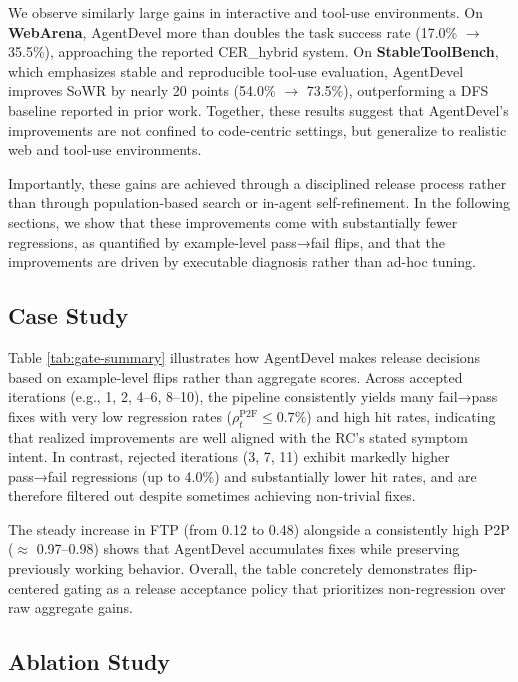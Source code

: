 \documentclass[11pt]{article}
\begin{document}
We observe similarly large gains in interactive and tool-use environments. On \textbf{WebArena}, AgentDevel more than doubles the task success rate (17.0\% $\rightarrow$ 35.5\%), approaching the reported CER\_hybrid system. On \textbf{StableToolBench}, which emphasizes stable and reproducible tool-use evaluation, AgentDevel improves SoWR by nearly 20 points (54.0\% $\rightarrow$ 73.5\%), outperforming a DFS baseline reported in prior work. Together, these results suggest that AgentDevel’s improvements are not confined to code-centric settings, but generalize to realistic web and tool-use environments.

Importantly, these gains are achieved through a disciplined release process rather than through population-based search or in-agent self-refinement. In the following sections, we show that these improvements come with substantially fewer regressions, as quantified by example-level pass→fail flips, and that the improvements are driven by executable diagnosis rather than ad-hoc tuning.

\subsection{Case Study}



Table \ref{tab:gate-summary} illustrates how AgentDevel makes release decisions based on example-level flips rather than aggregate scores. Across accepted iterations (e.g., 1, 2, 4–6, 8–10), the pipeline consistently yields many fail→pass fixes with very low regression rates ($\rho^{\mathrm{P2F}}_t \le 0.7\%$) and high hit rates, indicating that realized improvements are well aligned with the RC’s stated symptom intent. In contrast, rejected iterations (3, 7, 11) exhibit markedly higher pass→fail regressions (up to 4.0\%) and substantially lower hit rates, and are therefore filtered out despite sometimes achieving non-trivial fixes.

The steady increase in FTP (from 0.12 to 0.48) alongside a consistently high P2P ($\approx$ 0.97–0.98) shows that AgentDevel accumulates fixes while preserving previously working behavior. Overall, the table concretely demonstrates flip-centered gating as a release acceptance policy that prioritizes non-regression over raw aggregate gains.

\subsection{Ablation Study}

\end{document}
